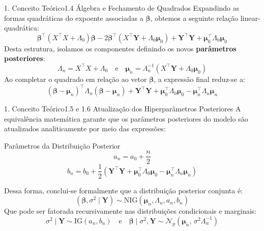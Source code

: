 \documentclass[10pt,aspectratio=169]{beamer}
\begin{document}
\begin{frame}{1. Conceito Teórico}{1.4 Álgebra e Fechamento de Quadrados}
    Expandindo as formas quadráticas do expoente associadas a $\boldsymbol{\beta}$, obtemos a seguinte relação linear-quadrática:
    $$\boldsymbol{\beta}^\top(X^\top X + \Lambda_0)\boldsymbol{\beta} - 2\boldsymbol{\beta}^\top(X^\top \mathbf{Y} + \Lambda_0 \boldsymbol{\mu}_0) + \mathbf{Y}^\top\mathbf{Y} + \boldsymbol{\mu}_0^\top\Lambda_0\boldsymbol{\mu}_0$$
    \vspace{0.2cm}
    Desta estrutura, isolamos os componentes definindo os novos \textbf{parâmetros posteriores}:
    $$\boxed{\Lambda_n = X^\top X + \Lambda_0} \quad \text{e} \quad \boxed{\boldsymbol{\mu}_n = \Lambda_n^{-1}(X^\top \mathbf{Y} + \Lambda_0 \boldsymbol{\mu}_0)}$$
    \vspace{0.2cm}
    Ao completar o quadrado em relação ao vetor $\boldsymbol{\beta}$, a expressão final reduz-se a:
    $$(\boldsymbol{\beta} - \boldsymbol{\mu}_n)^\top \Lambda_n (\boldsymbol{\beta} - \boldsymbol{\mu}_n) + \mathbf{Y}^\top\mathbf{Y} + \boldsymbol{\mu}_0^\top\Lambda_0\boldsymbol{\mu}_0 - \boldsymbol{\mu}_n^\top\Lambda_n\boldsymbol{\mu}_n$$
\end{frame}

\begin{frame}{1. Conceito Teórico}{1.5 e 1.6 Atualização dos Hiperparâmetros Posteriores}
    A equivalência matemática garante que os parâmetros posteriores do modelo são atualizados analiticamente por meio das expressões:
    \begin{block}{Parâmetros da Distribuição Posterior}
        $$a_n = a_0 + \frac{n}{2}$$
        $$b_n = b_0 + \frac{1}{2}\left(\mathbf{Y}^\top\mathbf{Y} + \boldsymbol{\mu}_0^\top\Lambda_0\boldsymbol{\mu}_0 - \boldsymbol{\mu}_n^\top\Lambda_n\boldsymbol{\mu}_n\right)$$
    \end{block}
    \vspace{0.2cm}
    Dessa forma, conclui-se formalmente que a distribuição posterior conjunta é:
    $$(\boldsymbol{\beta}, \sigma^2 \mid \mathbf{Y}) \sim \text{NIG}(\boldsymbol{\mu}_n, \Lambda_n, a_n, b_n)$$
    Que pode ser fatorada recursivamente nas distribuições condicionais e marginais:
    $$\sigma^2 \mid \mathbf{Y} \sim \text{IG}(a_n, b_n) \quad \text{e} \quad \boldsymbol{\beta} \mid \sigma^2, \mathbf{Y} \sim \mathcal{N}_p(\boldsymbol{\mu}_n,\, \sigma^2 \Lambda_n^{-1})$$
\end{frame}
\end{document}
